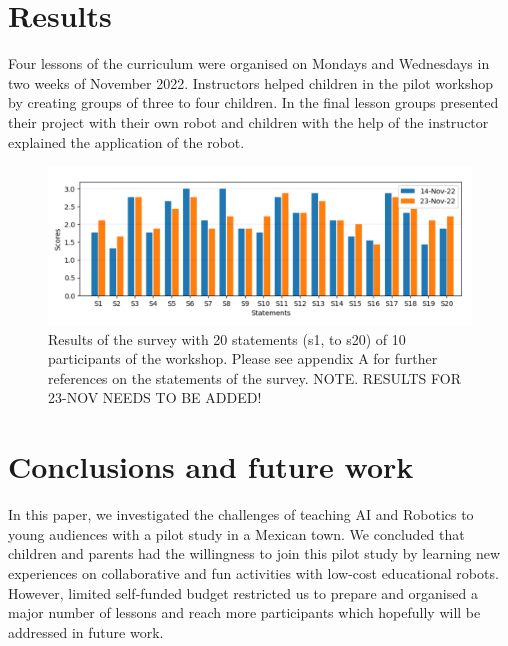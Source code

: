 \documentclass[sigconf,anonymous,review]{acmart}
\begin{document}
\section{Results}
Four lessons of the curriculum were organised on Mondays and Wednesdays in two weeks of November 2022. 
Instructors helped children in the pilot workshop by creating groups of three to four children.
In the final lesson groups presented their project with their own robot and children with the help of the instructor explained the application of the robot.


\begin{figure}[h]
  \centering
    \includegraphics[width=\linewidth]{../figures/results/outputs/drawing-v00.png}  %
    \caption{
    Results of the survey with 20 statements (s1, to s20) of 10 participants of the workshop. Please see appendix A for further references on the statements of the survey.
    NOTE. RESULTS FOR 23-NOV NEEDS TO BE ADDED!
    }
    \label{fig:results}
\end{figure}

\section{Conclusions and future work}
In this paper, we investigated the challenges of teaching AI and Robotics to young audiences with a pilot study in a Mexican town. 
We concluded that children and parents had the willingness to join this pilot study by learning new experiences on collaborative and fun activities with low-cost educational robots. 
However, limited self-funded budget restricted us to prepare and  organised a major number of lessons and reach more participants which hopefully will be addressed in future work.
\end{document}

